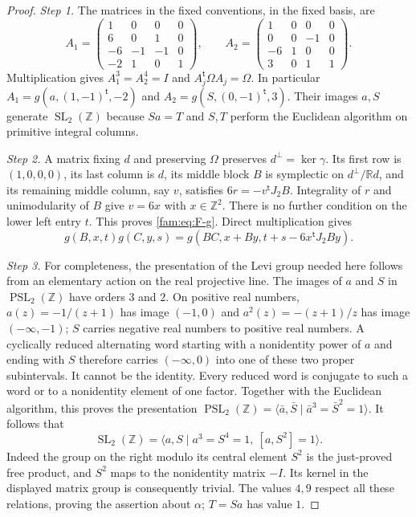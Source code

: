 \documentclass[11pt,a4paper]{article}
\theoremstyle{plain}
\theoremstyle{definition}
\begin{document}
\begin{proof}
\par\noindent\textit{Step 1.} The matrices in the fixed conventions, in the fixed basis, are
\[
 A_1=\begin{pmatrix}1&0&0&0\\6&0&1&0\\-6&-1&-1&0\\-2&1&0&1\end{pmatrix},
 \qquad
 A_2=\begin{pmatrix}1&0&0&0\\0&0&-1&0\\-6&1&0&0\\3&0&1&1\end{pmatrix}.
\]
Multiplication gives $A_1^3=A_2^4=I$ and
$A_j^{\mathsf t}\Omega A_j=\Omega$.  In particular
$A_1=g(a,(1,-1)^{\mathsf t},-2)$ and
$A_2=g(S,(0,-1)^{\mathsf t},3)$.  Their images $a,S$ generate
$\operatorname{SL}_2(\mathbb Z)$ because $Sa=T$ and $S,T$ perform the
Euclidean algorithm on primitive integral columns.

\par\noindent\textit{Step 2.} A matrix fixing $d$ and preserving $\Omega$ preserves
$d^{\perp}=\ker\gamma$.  Its first row is $(1,0,0,0)$, its last column is
$d$, its middle block $B$ is symplectic on
$d^{\perp}/\mathbb Rd$, and its remaining middle column, say $v$, satisfies
$6r=-v^{\mathsf t}J_2B$.  Integrality of $r$ and unimodularity of $B$
give $v=6x$ with $x\in\mathbb Z^2$.  There is no further condition on
the lower left entry $t$.  This proves \eqref{fam:eq:F-g}.  Direct multiplication
gives
\begin{equation}\label{fam:eq:F-law}
 g(B,x,t)g(C,y,s)
 =g(BC,x+By,t+s-6x^{\mathsf t}J_2By).
\end{equation}

\par\noindent\textit{Step 3.} For completeness, the presentation of the Levi group needed here follows
from an elementary action on the real projective line.  The images of $a$
and $S$ in $\operatorname{PSL}_2(\mathbb Z)$ have orders $3$ and $2$.
On positive real numbers, $a(z)=-1/(z+1)$ has image $(-1,0)$ and
$a^2(z)=-(z+1)/z$ has image $(-\infty,-1)$; $S$ carries negative real
numbers to positive real numbers.  A cyclically reduced alternating word
starting with a nonidentity power of $a$ and ending with $S$ therefore
carries $(-\infty,0)$ into one of these two proper subintervals.  It cannot
be the identity.  Every reduced word is conjugate to such a word or to a
nonidentity element of one factor.  Together with the Euclidean algorithm,
this proves the presentation
$\operatorname{PSL}_2(\mathbb Z)=\langle\bar a,\bar S\mid
\bar a^3=\bar S^2=1\rangle$.  It follows that
\begin{equation}\label{fam:eq:F-SLpresentation}
 \operatorname{SL}_2(\mathbb Z)=
 \langle a,S\mid a^3=S^4=1,\ [a,S^2]=1\rangle.
\end{equation}
Indeed the group on the right modulo its central element $S^2$ is the
just-proved free product, and $S^2$ maps to the nonidentity matrix $-I$.
Its kernel in the displayed matrix group is consequently trivial.
The values $4,9$ respect all these relations, proving the assertion about
$\alpha$; $T=Sa$ has value $1$.


\end{proof}
\end{document}
